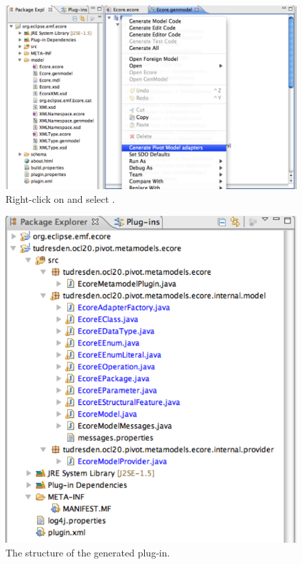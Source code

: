 \begin{figure}[!htbp]
	\centering
	\includegraphics[width=1.0\linewidth]{figures/pivotModelAdaption/GeneratePivotModelAdapters}
	\caption{Right-click on  and select .}
	\label{pic:pivotModelAdaption:GeneratePivotModelAdapters}
\end{figure}

\begin{figure}[!htbp]
	\centering
	\includegraphics[width=1.0\linewidth]{figures/pivotModelAdaption/GeneratedPlugin}
	\caption{The structure of the generated plug-in.}
	\label{pic:pivotModelAdaption:GeneratedPlugin}
\end{figure}